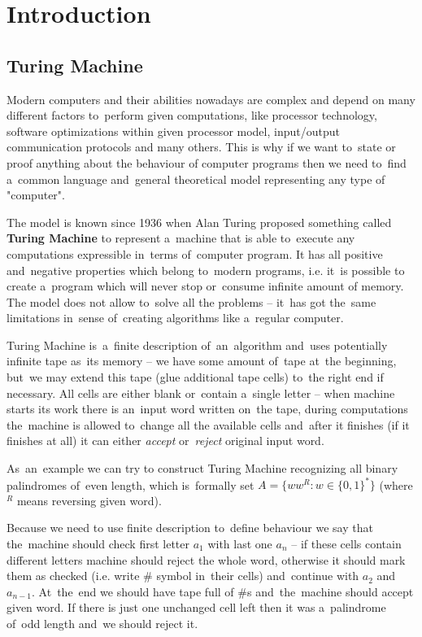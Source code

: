 \documentclass[english,shortabstract,mgr]{iithesis}
\author         {Jadwiga Pokorska}
\begin{document}

\chapter{Introduction}

\section{Turing Machine}

Modern computers and their abilities nowadays are complex and depend on many different factors
to~perform given computations, like processor technology, software optimizations within given
processor model, input/output communication protocols and many others. This is why if we want
to~state or proof anything about the behaviour of computer programs then we need to~find a~common
language and~general theoretical model representing any type of "computer".

The model is known since 1936 when Alan Turing proposed something called \textbf{Turing Machine}
to represent a~machine that is able to~execute any computations expressible in~terms of~computer program.
It has all positive and~negative properties which belong to~modern programs, i.e. it~is possible
to create a~program which will never stop or~consume infinite amount of memory. The model does not allow
to~solve all the problems -- it~has got the~same limitations in~sense of~creating algorithms
like a~regular computer.

Turing Machine is~a~finite description of~an~algorithm and~uses potentially infinite tape
as~its memory -- we have some amount of~tape at~the beginning, but~we may extend this tape
(glue additional tape cells) to~the right end if necessary. All cells are either blank
or~contain a~single letter -- when machine starts its work there is an~input word
written on~the tape, during computations the~machine is allowed to~change all the available
cells and~after it finishes (if it finishes at all) it can either \textit{accept}
or~\textit{reject} original input word.

As~an~example we can try to construct Turing Machine recognizing all binary palindromes of~even length,
which is~formally set $A = \{ ww^R : w \in \{0,1\}^* \}$ (where $^R$ means reversing given word).

Because we need to use finite description to~define behaviour we say that the~machine should
check first letter $a_1$ with last one $a_n$ -- if these cells contain different letters machine
should reject the whole word, otherwise it should mark them as checked (i.e. write $\#$ symbol in~their cells)
and~continue with $a_2$ and~$a_{n-1}$. At~the~end we should have tape full of $\#$s and~the~machine
should accept given word. If there is just one unchanged cell left then it was a~palindrome
of~odd length and~we should reject it.
\end{document}
